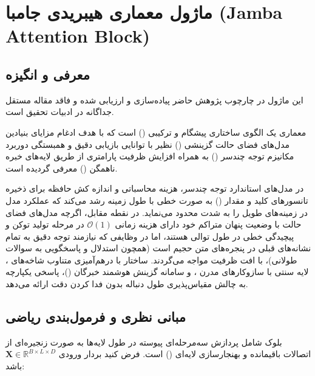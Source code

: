 \section{ماژول معماری هیبریدی جامبا (Jamba Attention Block)}
\label{sec:module_jamba}

\subsection{معرفی و انگیزه}
این ماژول در چارچوب پژوهش حاضر پیاده‌سازی و ارزیابی شده و فاقد مقاله مستقل جداگانه در ادبیات تحقیق است.

معماری  یک الگوی ساختاری پیشگام و ترکیبی () است که با هدف ادغام مزایای بنیادین مدل‌های فضای حالت گزینشی () نظیر  با توانایی بازیابی دقیق و همبستگی دوربرد مکانیزم توجه چندسر () به همراه افزایش ظرفیت پارامتری از طریق لایه‌های خبره ناهمگن () معرفی گردیده است. 

در مدل‌های استاندارد توجه چندسر، هزینه محاسباتی و اندازه کش حافظه برای ذخیره تانسورهای کلید و مقدار () به صورت خطی با طول زمینه رشد می‌کند که عملکرد مدل در زمینه‌های طویل را به شدت محدود می‌نماید. در نقطه مقابل، اگرچه مدل‌های فضای حالت با وضعیت پنهان متراکم خود دارای هزینه زمانی $\mathcal{O}(1)$ در مرحله تولید توکن و پیچیدگی خطی در طول توالی هستند، اما در وظایفی که نیازمند توجه دقیق به تمام نشانه‌های قبلی در پنجره‌های متن حجیم است (همچون استدلال و پاسخگویی به سوالات طولانی)، با افت ظرفیت مواجه می‌گردند. ساختار  با درهم‌آمیزی متناوب شاخه‌های ، لایه سنتی  با سازوکارهای مدرن ، و سامانه گزینش هوشمند خبرگان ()، پاسخی یکپارچه به چالش مقیاس‌پذیری طول دنباله بدون فدا کردن دقت ارائه می‌دهد.

\subsection{مبانی نظری و فرمول‌بندی ریاضی}
بلوک  شامل پردازش سه‌مرحله‌ای پیوسته در طول لایه‌ها به صورت زنجیره‌ای از اتصالات باقیمانده و بهنجارسازی لایه‌ای () است. فرض کنید بردار ورودی $\mathbf{X} \in \mathbb{R}^{B \times L \times D}$ باشد:

